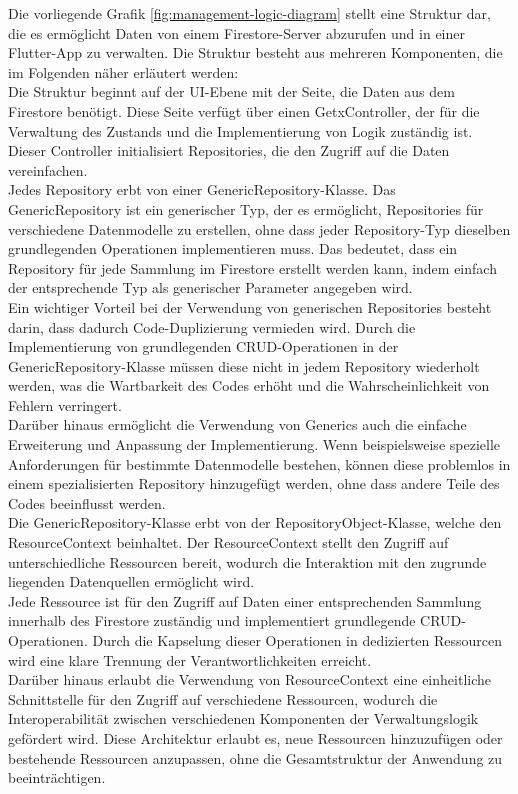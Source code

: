 Die vorliegende Grafik \ref{fig:management-logic-diagram} stellt eine Struktur dar, die es ermöglicht Daten von einem Firestore-Server abzurufen und in einer Flutter-App zu verwalten. Die Struktur besteht aus mehreren Komponenten, die im Folgenden näher erläutert werden:
\\
Die Struktur beginnt auf der UI-Ebene mit der Seite, die Daten aus dem Firestore benötigt. Diese Seite verfügt über einen GetxController, der für die Verwaltung des Zustands und die Implementierung von Logik zuständig ist. Dieser Controller initialisiert Repositories, die den Zugriff auf die Daten vereinfachen.
\\
Jedes Repository erbt von einer GenericRepository-Klasse. Das GenericRepository ist ein generischer Typ, der es ermöglicht, Repositories für verschiedene Datenmodelle zu erstellen, ohne dass jeder Repository-Typ dieselben grundlegenden Operationen implementieren muss. Das bedeutet, dass ein Repository für jede Sammlung im Firestore erstellt werden kann, indem einfach der entsprechende Typ als generischer Parameter angegeben wird.
\\
Ein wichtiger Vorteil bei der Verwendung von generischen Repositories besteht darin, dass dadurch Code-Duplizierung vermieden wird. Durch die Implementierung von grundlegenden CRUD-Operationen in der GenericRepository-Klasse müssen diese nicht in jedem Repository wiederholt werden, was die Wartbarkeit des Codes erhöht und die Wahrscheinlichkeit von Fehlern verringert.
\\
Darüber hinaus ermöglicht die Verwendung von Generics auch die einfache Erweiterung und Anpassung der Implementierung. Wenn beispielsweise spezielle Anforderungen für bestimmte Datenmodelle bestehen, können diese problemlos in einem spezialisierten Repository hinzugefügt werden, ohne dass andere Teile des Codes beeinflusst werden.
\\
Die GenericRepository-Klasse erbt von der RepositoryObject-Klasse, welche den ResourceContext beinhaltet. Der ResourceContext stellt den Zugriff auf unterschiedliche Ressourcen bereit, wodurch die Interaktion mit den zugrunde liegenden Datenquellen ermöglicht wird.
\\
Jede Ressource ist für den Zugriff auf Daten einer entsprechenden Sammlung innerhalb des Firestore zuständig und implementiert grundlegende CRUD-Operationen. Durch die Kapselung dieser Operationen in dedizierten Ressourcen wird eine klare Trennung der Verantwortlichkeiten erreicht.
\\
Darüber hinaus erlaubt die Verwendung von ResourceContext eine einheitliche Schnittstelle für den Zugriff auf verschiedene Ressourcen, wodurch die Interoperabilität zwischen verschiedenen Komponenten der Verwaltungslogik gefördert wird. Diese Architektur erlaubt es, neue Ressourcen hinzuzufügen oder bestehende Ressourcen anzupassen, ohne die Gesamtstruktur der Anwendung zu beeinträchtigen.


